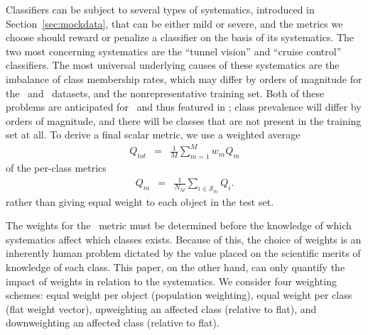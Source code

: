 Classifiers can be subject to several types of systematics, introduced in Section~\ref{sec:mockdata}, that can be either mild or severe, and the metrics we choose should reward or penalize a classifier on the basis of its systematics.
The two most concerning systematics are the ``tunnel vision'' and ``cruise control'' classifiers.
The most universal underlying causes of these systematics are the imbalance of class membership rates, which may differ by orders of magnitude for the \plasticc\ and \lsst\ datasets, and the nonrepresentative training set.
Both of these problems are anticipated for \lsst\ and thus featured in \plasticc; class prevalence will differ by orders of magnitude, and there will be classes that are not present in the training set at all.
To derive a final scalar metric, we use a weighted average
\begin{eqnarray}
Q_{tot} &=& \frac{1}{M}\sum_{m=1}^{M}w_{m}Q_{m}
\end{eqnarray}
of the per-class metrics
\begin{eqnarray}
Q_{m} &=& \frac{1}{N_{M}}\sum_{i\in\mathcal{S}_{m}}Q_{i}.
\end{eqnarray}
rather than giving equal weight to each object in the test set.

The weights for the \plasticc\ metric must be determined before the knowledge of which systematics affect which classes exists.
Because of this, the choice of weights is an inherently human problem dictated by the value placed on the scientific merits of knowledge of each class.
This paper, on the other hand, can only quantify the impact of weights in relation to the systematics.
We consider four weighting schemes: equal weight per object (population weighting), equal weight per class (flat weight vector), upweighting an affected class (relative to flat), and downweighting an affected class (relative to flat).

%
